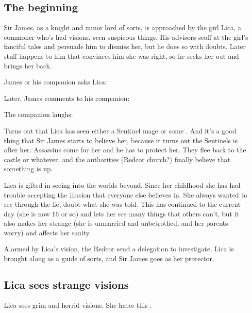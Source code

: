 \subsection{The beginning}
Sir James, as a knight and minor lord of sorts, is approached by the girl Lica, a commoner who's had visions, seen suspicous things. 
His advisors scoff at the girl's fanciful tales and persuade him to dismiss her, but he does so with doubts. 
Later stuff happens to him that convinces him she was right, so he seeks her out and brings her back. 

James or his companion asks Lica: 


Later, James comments to his companion: 

The companion laughs. 

Turns out that Lica has seen either a Sentinel mage or some \daemon. 
And it's a good thing that Sir James starts to believe her, because it turns out the Sentinels is after her. Assassins come for her and he has to protect her. They flee back to the castle or whatever, and the authorities (Redcor church?) finally believe that something is up. 

Lica is gifted in seeing into the worlds beyond. Since her childhood she has had trouble accepting the illusion that everyone else believes in. She always wanted to see through the lie, doubt what she was told. This has continued to the current day (she is now 16 or so) and lets her see many things that others can't, but it also makes her strange (she is unmarried and unbetrothed, and her parents worry) and affects her sanity. 

Alarmed by Lica's vision, the Redcor send a delegation to investigate. Lica is brought along as a guide of sorts, and Sir James goes as her protector. 









\subsection{Lica sees strange visions}
Lica sees grim and horrid visions. 
She hates this . 

